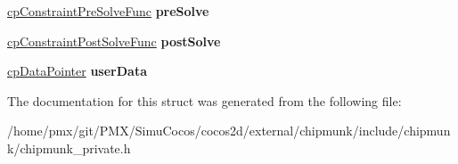 \begin{DoxyCompactItemize}
\item 
\mbox{\label{structcpConstraint_a4a9e75379d50abaf80662cad350324d6}} 
\hyperlink{group__cpConstraint_gaf6038a155d58f45d6ab977dd1b1398de}{cp\+Constraint\+Pre\+Solve\+Func} {\bfseries pre\+Solve}
\item 
\mbox{\label{structcpConstraint_a1be309feb59902e01cfcaeb5f6696930}} 
\hyperlink{group__cpConstraint_ga2208378297a7265d0cc69f31697961b9}{cp\+Constraint\+Post\+Solve\+Func} {\bfseries post\+Solve}
\item 
\mbox{\label{structcpConstraint_a4911f2a6b23b6c16fdd00443be4d002f}} 
\hyperlink{group__basicTypes_ga2ac2c3c31e21893941f9e4f8ee279447}{cp\+Data\+Pointer} {\bfseries user\+Data}
\end{DoxyCompactItemize}


The documentation for this struct was generated from the following file\+:\begin{DoxyCompactItemize}
\item 
/home/pmx/git/\+P\+M\+X/\+Simu\+Cocos/cocos2d/external/chipmunk/include/chipmunk/chipmunk\+\_\+private.\+h\end{DoxyCompactItemize}
